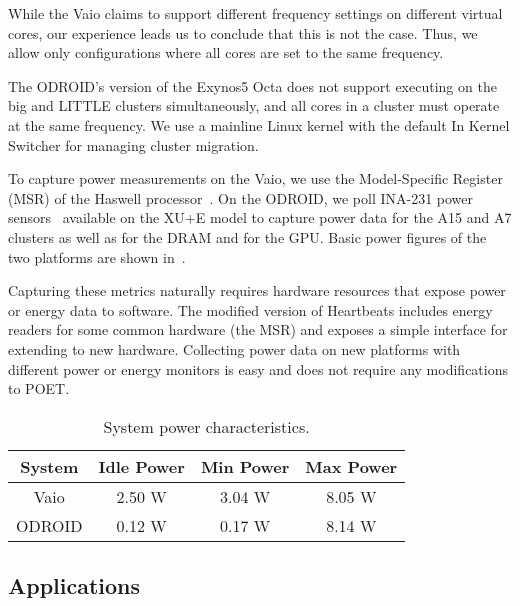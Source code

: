 While the Vaio claims to support different frequency settings on different virtual cores, our experience leads us to conclude that this is not the case.
Thus, we allow only configurations where all cores are set to the same frequency.

The ODROID's version of the Exynos5 Octa does not support executing on the big and LITTLE clusters simultaneously, and all cores in a cluster must operate at the same frequency.
We use a mainline Linux kernel with the default In Kernel Switcher for managing cluster migration.

To capture power measurements on the Vaio, we use the Model-Specific Register (MSR) of the Haswell processor~\cite{SandyBridge}.
On the ODROID, we poll INA-231 power sensors~\cite{ina231} available on the XU+E model to capture power data for the A15 and A7 clusters as well as for the DRAM and for the GPU.
Basic power figures of the two platforms are shown in~.

Capturing these metrics naturally requires hardware resources that expose power or energy data to software.
The modified version of Heartbeats includes energy readers for some common hardware (\eg the MSR) and exposes a simple interface for extending to new hardware.
Collecting power data on new platforms with different power or energy monitors is easy and does not require any modifications to POET.

\begin{table}[tb]
\centering
\caption{System power characteristics.}
\begin{tabular}{cccc}
  \textbf{System} & \textbf{Idle Power} & \textbf{Min Power} & \textbf{Max Power} \\
  \hline
  \hline
  Vaio   & 2.50 W & 3.04 W & 8.05 W \\
  ODROID & 0.12 W & 0.17 W & 8.14 W \\
  \hline
  \hline
\end{tabular}
\label{tbl:poet-power}
\end{table}


\subsection{Applications}

